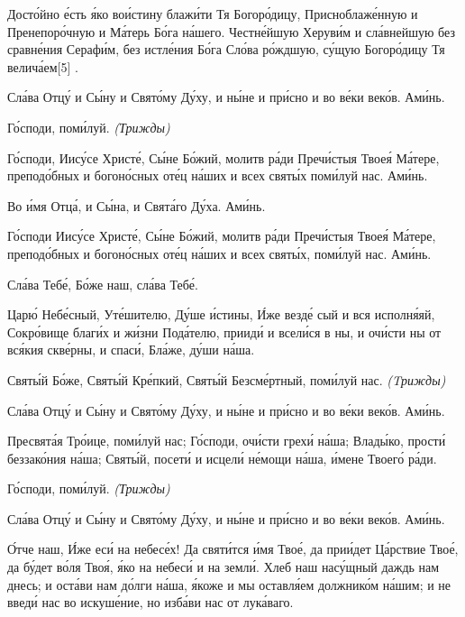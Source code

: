    Досто́йно е́сть я́ко вои́стину блажи́ти Тя Богоро́дицу, Присноблаже́нную и
Пренепоро́чную и Ма́терь Бо́га на́шего. Честне́йшую Херуви́м и сла́внейшую без
сравне́ния Серафи́м, без истле́ния Бо́га Сло́ва ро́ждшую, су́щую Богоро́дицу Тя
велича́ем[5]
.


   Сла́ва Отцу́ и Сы́ну и Свято́му Ду́ху, и ны́не и при́сно и во ве́ки веко́в.
Ами́нь.


   Го́споди, поми́луй. \itshape (Трижды)\normalfont{}


   Го́споди, Иису́се Христе́, Сы́не Бо́жий, молитв ра́ди Пречи́стыя Твоея́
Ма́тере, преподо́бных и богоно́сных оте́ц на́ших и всех святы́х поми́луй нас.
Ами́нь.

   


\mychapterending





Во и́мя Отца́, и Сы́на, и Свята́го Ду́ха. Ами́нь.


   Го́споди Иису́се Христе́, Сы́не Бо́жий, молитв ра́ди Пречи́стыя Твоея́
Ма́тере, преподо́бных и богоно́сных оте́ц на́ших и всех святы́х, поми́луй нас.
Ами́нь.


   Сла́ва Тебе́, Бо́же наш, сла́ва Тебе́.


   Царю́ Небе́сный, Уте́шителю, Ду́ше и́стины, И́же везде́ сый и вся
исполня́яй, Сокро́вище благи́х и жи́зни Пода́телю, прииди́ и всели́ся в ны, и
очи́сти ны от вся́кия скве́рны, и спаси́, Бла́же, ду́ши на́ша.


   Святы́й Бо́же, Святы́й Кре́пкий, Святы́й Безсме́ртный, поми́луй нас.
\itshape (Tрижды)\normalfont{}


   Сла́ва Отцу́ и Сы́ну и Свято́му Ду́ху, и ны́не и при́сно и во ве́ки веко́в.
Ами́нь.


   Пресвята́я Тро́ице, поми́луй нас; Го́споди, очи́сти грехи́ на́ша; Влады́ко,
прости́ беззако́ния на́ша; Святы́й, посети́ и исцели́ не́мощи на́ша, и́мене
Твоего́ ра́ди.


   Го́споди, поми́луй. \itshape (Трижды)\normalfont{}


   Сла́ва Отцу́ и Сы́ну и Свято́му Ду́ху, и ны́не и при́сно и во ве́ки веко́в.
Ами́нь.


   О́тче наш, И́же еси́ на небесе́х! Да святи́тся и́мя Твое́, да прии́дет
Ца́рствие Твое́, да бу́дет во́ля Твоя́, я́ко на небеси́ и на земли́. Хлеб наш
насу́щный даждь нам днесь; и оста́ви нам до́лги на́ша, я́коже и мы оставля́ем
должнико́м на́шим; и не введи́ нас во искуше́ние, но изба́ви нас от
лука́ваго.
   


